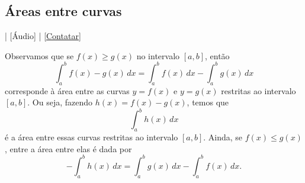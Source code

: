 \subsection{Áreas entre curvas}

\begin{flushright}
  [Vídeo] | [Áudio] | \href{https://phkonzen.github.io/notas/contato.html}{[Contatar]}
\end{flushright}

Observamos que se $f(x)\geq g(x)$ no intervalo $[a, b]$, então
\begin{equation}
  \int_a^b f(x)-g(x)\,dx = \int_a^bf(x)\,dx - \int_a^bg(x)\,dx
\end{equation}
corresponde à área entre as curvas $y = f(x)$ e $y = g(x)$ restritas ao intervalo $[a,b]$. Ou seja, fazendo $h(x) = f(x)-g(x)$, temos que
\begin{equation}
  \int_a^bh(x)\,dx
\end{equation}
é a área entre essas curvas restritas ao intervalo $[a, b]$. Ainda, se $f(x)\leq g(x)$, entre a área entre elas é dada por
\begin{equation}
  -\int_a^bh(x)\,dx = \int_a^bg(x)\,dx - \int_a^bf(x)\,dx.
\end{equation}

